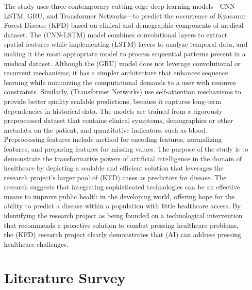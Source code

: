 \documentclass[conference]{IEEEtran}
\begin{document}
The study uses three contemporary cutting-edge deep learning models—CNN-LSTM, GRU, and Transformer Networks—to predict the occurrence of Kyasanur Forest Disease (KFD) based on clinical and demographic components of medical dataset. The (CNN-LSTM) model combines convolutional layers to extract spatial features while implementing (LSTM) layers to analyze temporal data, and making it the most appropriate model to process sequential patterns present in a medical dataset. Although the (GRU) model does not leverage convolutional or recurrent mechanisms, it has a simpler architecture that enhances sequence learning while minimizing the computational demands to a user with resource constraints. Similarly, (Transformer Networks) use self-attention mechanisms to provide better quality scalable predictions, because it captures long-term dependencies in historical data. The models are trained from a rigorously preprocessed dataset that contains clinical symptoms, demographics or other metadata on the patient, and quantitative indicators, such as blood. Preprocessing features include method for encoding features, normalizing features, and preparing features for missing values. The purpose of the study is to demonstrate the transformative powers of artificial intelligence in the domain of healthcare by depicting a scalable and efficient solution that leverages the research project’s larger pool of (KFD) cases as predictors for disease. The research suggests that integrating sophisticated technologies can be an effective means to improve public health in the developing world, offering hope for the ability to predict a disease within a population with little healthcare access. By identifying the research project as being founded on a technological intervention that recommends a proactive solution to combat pressing healthcare problems, the (KFD) research project clearly demonstrates that (AI) can address pressing healthcare challenges.
\section{Literature Survey}
\end{document}
